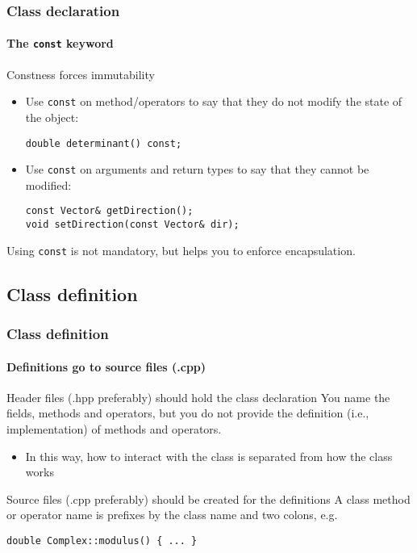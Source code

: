 \begin{frame}[fragile]
\frametitle{Class declaration}
\framesubtitle{The \texttt{const} keyword}

\begin{block}{Constness forces immutability}
\begin{itemize}
\item Use \texttt{const} on method/operators to say that they do not modify the state of the object:
\begin{verbatim}
double determinant() const;
\end{verbatim}
\item Use \texttt{const} on arguments and return types to say that they cannot be modified:
\begin{verbatim}
const Vector& getDirection();
void setDirection(const Vector& dir);
\end{verbatim}
\end{itemize}
Using \texttt{const} is not mandatory, but helps you to enforce encapsulation.
\end{block}

\end{frame}

\subsection{Class definition}

\begin{frame}[fragile]
\frametitle{Class definition}
\framesubtitle{Definitions go to source files (.cpp)}

\begin{block}{Header files (.hpp preferably) should hold the class declaration}
You name the fields, methods and operators, but you do not provide the definition (i.e., implementation) of methods and operators.
\begin{itemize}
\item In this way, how to interact with the class is separated from how the class works
\end{itemize}
\end{block}
\pause
\begin{block}{Source files (.cpp preferably) should be created for the definitions}
A class method or operator name is prefixes by the class name and two colons, e.g.

\begin{verbatim}
double Complex::modulus() { ... }
\end{verbatim}
\end{block}

\end{frame}


